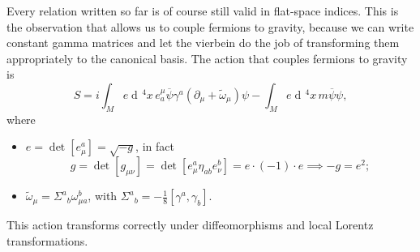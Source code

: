 \documentclass[a4paper,12pt]{book}
\newcommand{\dd}{\mathop{\mathrm{d}\!}{}}
\theoremstyle{definition}
\theoremstyle{remark}
\begin{document}
Every relation written so far is of course still valid in flat-space indices. This is the observation that allows us to couple fermions to gravity, because we can write constant gamma matrices and let the vierbein do the job of transforming them appropriately to the canonical basis. The action that couples fermions to gravity is
\[S=i\int_Me\dd^4x\,e^\mu_a\overline\psi\gamma^a(\partial_\mu+\tilde\omega_\mu)\psi-\int_Me\dd^4x\,m\overline\psi\psi,\]
where
\begin{itemize}
\item $e=\det[e^a_\mu]=\sqrt{-g}$, in fact
\[g=\det[g_{\mu\nu}]=\det[e^a_\mu\eta_{ab}e^b_\nu]=e\cdot(-1)\cdot e\implies -g=e^2;\]
\item $\tilde\omega_\mu=\Sigma^a{}_b\omega^b_{\mu a}$, with $\Sigma^a{}_b=-\frac{1}{8}[\gamma^a,\gamma_b]$.
\end{itemize}
This action transforms correctly under diffeomorphisms and local Lorentz transformations.
\end{document}
